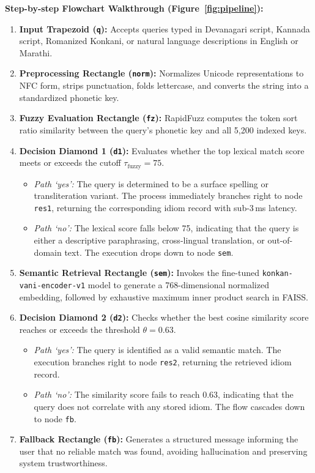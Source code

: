 \documentclass[12pt,a4paper]{article}
\begin{document}
\textbf{Step-by-step Flowchart Walkthrough (Figure~\ref{fig:pipeline}):}
\begin{enumerate}
  \item \textbf{Input Trapezoid (\texttt{q}):} Accepts queries typed in Devanagari script, Kannada script, Romanized Konkani, or natural language descriptions in English or Marathi.
  \item \textbf{Preprocessing Rectangle (\texttt{norm}):} Normalizes Unicode representations to NFC form, strips punctuation, folds lettercase, and converts the string into a standardized phonetic key.
  \item \textbf{Fuzzy Evaluation Rectangle (\texttt{fz}):} RapidFuzz computes the token sort ratio similarity between the query's phonetic key and all 5,200 indexed keys.
  \item \textbf{Decision Diamond 1 (\texttt{d1}):} Evaluates whether the top lexical match score meets or exceeds the cutoff $\tau_{\mathrm{fuzzy}} = 75$.
  \begin{itemize}
    \item \emph{Path `yes':} The query is determined to be a surface spelling or transliteration variant. The process immediately branches right to node \texttt{res1}, returning the corresponding idiom record with sub-3\,ms latency.
    \item \emph{Path `no':} The lexical score falls below 75, indicating that the query is either a descriptive paraphrasing, cross-lingual translation, or out-of-domain text. The execution drops down to node \texttt{sem}.
  \end{itemize}
  \item \textbf{Semantic Retrieval Rectangle (\texttt{sem}):} Invokes the fine-tuned \texttt{konkan-vani-encoder-v1} model to generate a 768-dimensional normalized embedding, followed by exhaustive maximum inner product search in FAISS.
  \item \textbf{Decision Diamond 2 (\texttt{d2}):} Checks whether the best cosine similarity score reaches or exceeds the threshold $\theta = 0.63$.
  \begin{itemize}
    \item \emph{Path `yes':} The query is identified as a valid semantic match. The execution branches right to node \texttt{res2}, returning the retrieved idiom record.
    \item \emph{Path `no':} The similarity score fails to reach 0.63, indicating that the query does not correlate with any stored idiom. The flow cascades down to node \texttt{fb}.
  \end{itemize}
  \item \textbf{Fallback Rectangle (\texttt{fb}):} Generates a structured message informing the user that no reliable match was found, avoiding hallucination and preserving system trustworthiness.
\end{enumerate}
\end{document}
